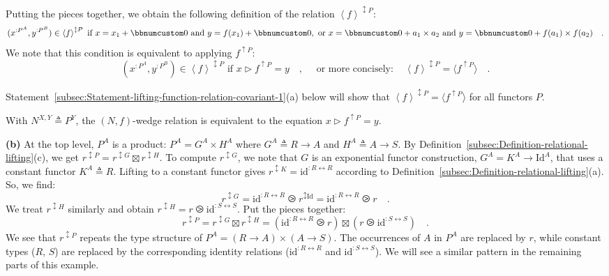 Putting the pieces together, we obtain the following definition of
the relation $\left<f\right>^{\updownarrow P}$:
\[
(x^{:P^{A}},y^{:P^{B}})\in\left<f\right>^{\updownarrow P}\text{ if }x=x_{1}+\bbnum 0\text{ and }y=f(x_{1})+\bbnum 0,\text{ or }x=\bbnum 0+a_{1}\times a_{2}\text{ and }y=\bbnum 0+f(a_{1})\times f(a_{2})\quad.
\]
We note that this condition is equivalent to applying $f^{\uparrow P}$:
\[
(x^{:P^{A}},y^{:P^{B}})\in\left<f\right>^{\updownarrow P}\text{ if }x\triangleright f^{\uparrow P}=y\quad,\quad\text{ or more concisely}:\quad\left<f\right>^{\updownarrow P}=\langle f^{\uparrow P}\rangle\quad.
\]

Statement~\ref{subsec:Statement-lifting-function-relation-covariant-1}(a)
below will show that $\left<f\right>^{\updownarrow P}=\langle f^{\uparrow P}\rangle$
for all functors $P$.

With $N^{X,Y}\triangleq P^{Y}$, the $\left(N,f\right)$-wedge relation
is equivalent to the equation $x\triangleright f^{\uparrow P}=y$.

\textbf{(b)} At the top level, $P^{A}$ is a product: $P^{A}=G^{A}\times H^{A}$
where $G^{A}\triangleq R\rightarrow A$ and $H^{A}\triangleq A\rightarrow S$.
By Definition~\ref{subsec:Definition-relational-lifting}(c), we
get $r^{\updownarrow P}=r^{\updownarrow G}\boxtimes r^{\updownarrow H}$.
To compute $r^{\updownarrow G}$, we note that $G$ is an exponential
functor construction, $G^{A}=K^{A}\rightarrow\text{Id}^{A}$, that
uses a constant functor $K^{A}\triangleq R$. Lifting to a constant
functor gives $r^{\updownarrow K}=\text{id}^{:R\leftrightarrow R}$
according to Definition~\ref{subsec:Definition-relational-lifting}(a).
So, we find:
\[
r^{\updownarrow G}=\text{id}^{:R\leftrightarrow R}\ogreaterthan r^{\updownarrow\text{Id}}=\text{id}^{:R\leftrightarrow R}\ogreaterthan r\quad.
\]
We treat $r^{\updownarrow H}$ similarly and obtain $r^{\updownarrow H}=r\ogreaterthan\text{id}^{:S\leftrightarrow S}$.
Put the pieces together:
\[
r^{\updownarrow P}=r^{\updownarrow G}\boxtimes r^{\updownarrow H}=(\text{id}^{:R\leftrightarrow R}\ogreaterthan r)\boxtimes(r\ogreaterthan\text{id}^{:S\leftrightarrow S})\quad.
\]
We see that $r^{\updownarrow P}$ repeats the type structure of $P^{A}=(R\rightarrow A)\times(A\rightarrow S)$.
The occurrences of $A$ in $P^{A}$ are replaced by $r$, while constant
types ($R$, $S$) are replaced by the corresponding identity relations
($\text{id}^{:R\leftrightarrow R}$ and $\text{id}^{:S\leftrightarrow S}$).
We will see a similar pattern in the remaining parts of this example.

